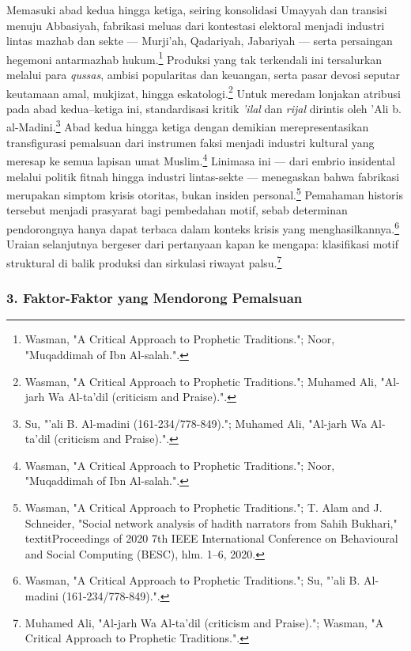 Memasuki abad kedua hingga ketiga, seiring konsolidasi Umayyah dan transisi menuju Abbasiyah, fabrikasi meluas dari kontestasi elektoral menjadi industri lintas mazhab dan sekte --- Murji'ah, Qadariyah, Jabariyah --- serta persaingan hegemoni antarmazhab hukum.\footnote{Wasman, "A Critical Approach to Prophetic Traditions."; Noor, "Muqaddimah of Ibn Al-salah.".} Produksi yang tak terkendali ini tersalurkan melalui para \textit{qussas}, ambisi popularitas dan keuangan, serta pasar devosi seputar keutamaan amal, mukjizat, hingga eskatologi.\footnote{Wasman, "A Critical Approach to Prophetic Traditions."; Muhamed Ali, "Al-jarh Wa Al-ta'dil (criticism and Praise).".} Untuk meredam lonjakan atribusi pada abad kedua--ketiga ini, standardisasi kritik \textit{'ilal} dan \textit{rijal} dirintis oleh 'Ali b. al-Madini.\footnote{Su, "'ali B. Al-madini (161-234/778-849)."; Muhamed Ali, "Al-jarh Wa Al-ta'dil (criticism and Praise).".} Abad kedua hingga ketiga dengan demikian merepresentasikan transfigurasi pemalsuan dari instrumen faksi menjadi industri kultural yang meresap ke semua lapisan umat Muslim.\footnote{Wasman, "A Critical Approach to Prophetic Traditions."; Noor, "Muqaddimah of Ibn Al-salah.".} Linimasa ini --- dari embrio insidental melalui politik fitnah hingga industri lintas-sekte --- menegaskan bahwa fabrikasi merupakan simptom krisis otoritas, bukan insiden personal.\footnote{Wasman, "A Critical Approach to Prophetic Traditions."; T. Alam and J. Schneider, "Social network analysis of hadith narrators from Sahih Bukhari," \\textit{Proceedings of 2020 7th IEEE International Conference on Behavioural and Social Computing (BESC)}, hlm. 1--6, 2020.} Pemahaman historis tersebut menjadi prasyarat bagi pembedahan motif, sebab determinan pendorongnya hanya dapat terbaca dalam konteks krisis yang menghasilkannya.\footnote{Wasman, "A Critical Approach to Prophetic Traditions."; Su, "'ali B. Al-madini (161-234/778-849).".} Uraian selanjutnya bergeser dari pertanyaan kapan ke mengapa: klasifikasi motif struktural di balik produksi dan sirkulasi riwayat palsu.\footnote{Muhamed Ali, "Al-jarh Wa Al-ta'dil (criticism and Praise)."; Wasman, "A Critical Approach to Prophetic Traditions.".}

\subsubsection*{3. Faktor-Faktor yang Mendorong Pemalsuan}

